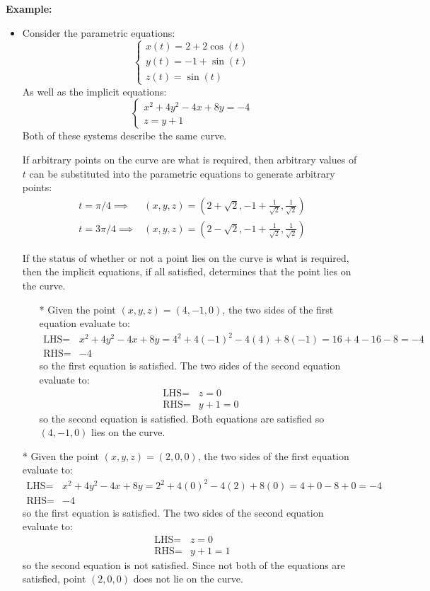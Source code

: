 \documentclass{article}
\begin{document}
\textbf{Example:}

\begin{itemize}
\item Consider the parametric equations:
\[\left\{\begin{array}{l}
x(t) = 2 + 2\cos(t) \\ 
y(t) = -1 + \sin(t) \\ 
z(t) = \sin(t)
\end{array}\right.\]
As well as the implicit equations:
\[\left\{\begin{array}{c}
x^2 + 4y^2 - 4x + 8y = -4 \\
z = y + 1
\end{array}\right.\]
Both of these systems describe the same curve. 

If arbitrary points on the curve are what is required, then arbitrary values of \(t\) can be substituted into the parametric equations to generate arbitrary points:
\begin{align*}
t = \pi/4 \implies & (x,y,z) = \left(2 + \sqrt{2}, -1 + \frac{1}{\sqrt{2}}, \frac{1}{\sqrt{2}}\right) \\   
t = 3\pi/4 \implies & (x,y,z) = \left(2 - \sqrt{2}, -1 + \frac{1}{\sqrt{2}}, \frac{1}{\sqrt{2}}\right)
\end{align*}

If the status of whether or not a point lies on the curve is what is required, then the implicit equations, if all satisfied, determines that the point lies on the curve.  
\begin{itemize}
\item[*] Given the point \((x, y, z) = (4, -1, 0)\), the two sides of the first equation evaluate to: 
\begin{align*}
\text{LHS} = & x^2 + 4y^2 - 4x + 8y = 4^2 + 4(-1)^2 - 4(4) + 8(-1) = 16 + 4 - 16 - 8 = -4 \\ 
\text{RHS} = & -4
\end{align*} 
so the first equation is satisfied. The two sides of the second equation evaluate to:
\begin{align*}
\text{LHS} = & z = 0 \\ 
\text{RHS} = & y + 1 = 0
\end{align*}
so the second equation is satisfied. Both equations are satisfied so \((4, -1, 0)\) lies on the curve. 
\end{itemize}
\item[*] Given the point \((x, y, z) = (2, 0, 0)\), the two sides of the first equation evaluate to: 
\begin{align*}
\text{LHS} = & x^2 + 4y^2 - 4x + 8y = 2^2 + 4(0)^2 - 4(2) + 8(0) = 4 + 0 - 8 + 0 = -4 \\ 
\text{RHS} = & -4
\end{align*} 
so the first equation is satisfied. The two sides of the second equation evaluate to:
\begin{align*}
\text{LHS} = & z = 0 \\ 
\text{RHS} = & y + 1 = 1
\end{align*}
so the second equation is not satisfied. Since not both of the equations are satisfied, point \((2, 0, 0)\) does not lie on the curve. 
\end{itemize}
\end{document}
